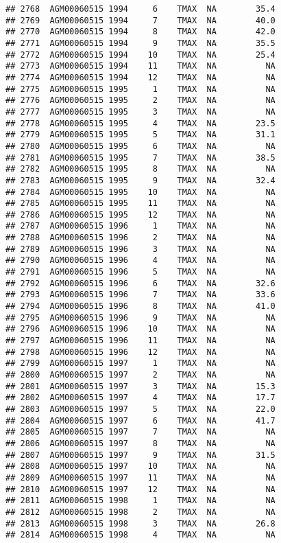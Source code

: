 \documentclass{article}\usepackage[]{graphicx}\usepackage[]{color}
\makeatletter
\newenvironment{kframe}{%
 \def\at@end@of@kframe{}%
 \ifinner\ifhmode%
  \def\at@end@of@kframe{\end{minipage}}%
  \begin{minipage}{\columnwidth}%
 \fi\fi%
 \def\FrameCommand##1{\hskip\@totalleftmargin \hskip-\fboxsep
 \colorbox{shadecolor}{##1}\hskip-\fboxsep
     \hskip-\linewidth \hskip-\@totalleftmargin \hskip\columnwidth}%
 \MakeFramed {\advance\hsize-\width
   \@totalleftmargin\z@ \linewidth\hsize
   \@setminipage}}%
 {\par\unskip\endMakeFramed%
 \at@end@of@kframe}
\newenvironment{knitrout}{}{} %
\makeatother
\begin{document}
\begin{knitrout}
\begin{kframe}
\begin{verbatim}
## 2768  AGM00060515 1994     6    TMAX  NA        35.4
## 2769  AGM00060515 1994     7    TMAX  NA        40.0
## 2770  AGM00060515 1994     8    TMAX  NA        42.0
## 2771  AGM00060515 1994     9    TMAX  NA        35.5
## 2772  AGM00060515 1994    10    TMAX  NA        25.4
## 2773  AGM00060515 1994    11    TMAX  NA          NA
## 2774  AGM00060515 1994    12    TMAX  NA          NA
## 2775  AGM00060515 1995     1    TMAX  NA          NA
## 2776  AGM00060515 1995     2    TMAX  NA          NA
## 2777  AGM00060515 1995     3    TMAX  NA          NA
## 2778  AGM00060515 1995     4    TMAX  NA        23.5
## 2779  AGM00060515 1995     5    TMAX  NA        31.1
## 2780  AGM00060515 1995     6    TMAX  NA          NA
## 2781  AGM00060515 1995     7    TMAX  NA        38.5
## 2782  AGM00060515 1995     8    TMAX  NA          NA
## 2783  AGM00060515 1995     9    TMAX  NA        32.4
## 2784  AGM00060515 1995    10    TMAX  NA          NA
## 2785  AGM00060515 1995    11    TMAX  NA          NA
## 2786  AGM00060515 1995    12    TMAX  NA          NA
## 2787  AGM00060515 1996     1    TMAX  NA          NA
## 2788  AGM00060515 1996     2    TMAX  NA          NA
## 2789  AGM00060515 1996     3    TMAX  NA          NA
## 2790  AGM00060515 1996     4    TMAX  NA          NA
## 2791  AGM00060515 1996     5    TMAX  NA          NA
## 2792  AGM00060515 1996     6    TMAX  NA        32.6
## 2793  AGM00060515 1996     7    TMAX  NA        33.6
## 2794  AGM00060515 1996     8    TMAX  NA        41.0
## 2795  AGM00060515 1996     9    TMAX  NA          NA
## 2796  AGM00060515 1996    10    TMAX  NA          NA
## 2797  AGM00060515 1996    11    TMAX  NA          NA
## 2798  AGM00060515 1996    12    TMAX  NA          NA
## 2799  AGM00060515 1997     1    TMAX  NA          NA
## 2800  AGM00060515 1997     2    TMAX  NA          NA
## 2801  AGM00060515 1997     3    TMAX  NA        15.3
## 2802  AGM00060515 1997     4    TMAX  NA        17.7
## 2803  AGM00060515 1997     5    TMAX  NA        22.0
## 2804  AGM00060515 1997     6    TMAX  NA        41.7
## 2805  AGM00060515 1997     7    TMAX  NA          NA
## 2806  AGM00060515 1997     8    TMAX  NA          NA
## 2807  AGM00060515 1997     9    TMAX  NA        31.5
## 2808  AGM00060515 1997    10    TMAX  NA          NA
## 2809  AGM00060515 1997    11    TMAX  NA          NA
## 2810  AGM00060515 1997    12    TMAX  NA          NA
## 2811  AGM00060515 1998     1    TMAX  NA          NA
## 2812  AGM00060515 1998     2    TMAX  NA          NA
## 2813  AGM00060515 1998     3    TMAX  NA        26.8
## 2814  AGM00060515 1998     4    TMAX  NA          NA

\end{verbatim}
\end{kframe}
\end{knitrout}
\end{document}

